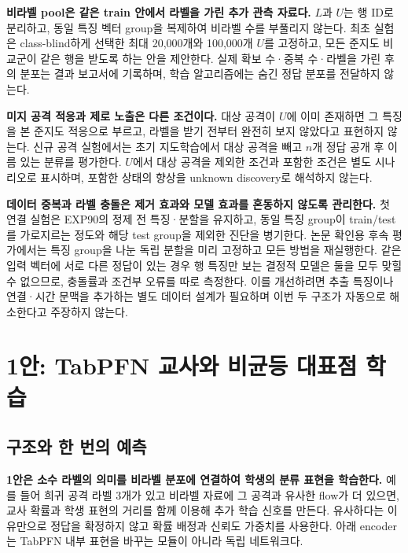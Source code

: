 \textbf{비라벨 pool은 같은 train 안에서 라벨을 가린 추가 관측 자료다.} $L$과 $U$는 행 ID로 분리하고, 동일 특징 벡터 group을 복제하여 비라벨 수를 부풀리지 않는다. 최초 실험은 class-blind하게 선택한 최대 20,000개와 100,000개 $U$를 고정하고, 모든 준지도 비교군이 같은 행을 받도록 하는 안을 제안한다. 실제 확보 수·중복 수·라벨을 가린 후의 분포는 결과 보고서에 기록하며, 학습 알고리즘에는 숨긴 정답 분포를 전달하지 않는다.

\textbf{미지 공격 적응과 제로 노출은 다른 조건이다.} 대상 공격이 $U$에 이미 존재하면 그 특징을 본 준지도 적응으로 부르고, 라벨을 받기 전부터 완전히 보지 않았다고 표현하지 않는다. 신규 공격 실험에서는 초기 지도학습에서 대상 공격을 빼고 $n$개 정답 공개 후 이름 있는 분류를 평가한다. $U$에서 대상 공격을 제외한 조건과 포함한 조건은 별도 시나리오로 표시하며, 포함한 상태의 향상을 unknown discovery로 해석하지 않는다.

\textbf{데이터 중복과 라벨 충돌은 제거 효과와 모델 효과를 혼동하지 않도록 관리한다.} 첫 연결 실험은 EXP90의 정제 전 특징·분할을 유지하고, 동일 특징 group이 train/test를 가로지르는 정도와 해당 test group을 제외한 진단을 병기한다. 논문 확인용 후속 평가에서는 특징 group을 나눈 독립 분할을 미리 고정하고 모든 방법을 재실행한다. 같은 입력 벡터에 서로 다른 정답이 있는 경우 행 특징만 보는 결정적 모델은 둘을 모두 맞힐 수 없으므로, 충돌률과 조건부 오류를 따로 측정한다. 이를 개선하려면 추출 특징이나 연결·시간 문맥을 추가하는 별도 데이터 설계가 필요하며 이번 두 구조가 자동으로 해소한다고 주장하지 않는다.

\clearpage
\section{1안: TabPFN 교사와 비균등 대표점 학습}
\subsection{구조와 한 번의 예측}
\textbf{1안은 소수 라벨의 의미를 비라벨 분포에 연결하여 학생의 분류 표현을 학습한다.} 예를 들어 희귀 공격 라벨 3개가 있고 비라벨 자료에 그 공격과 유사한 flow가 더 있으면, 교사 확률과 학생 표현의 거리를 함께 이용해 추가 학습 신호를 만든다. 유사하다는 이유만으로 정답을 확정하지 않고 확률 배정과 신뢰도 가중치를 사용한다. 아래 encoder는 TabPFN 내부 표현을 바꾸는 모듈이 아니라 독립 네트워크다.


